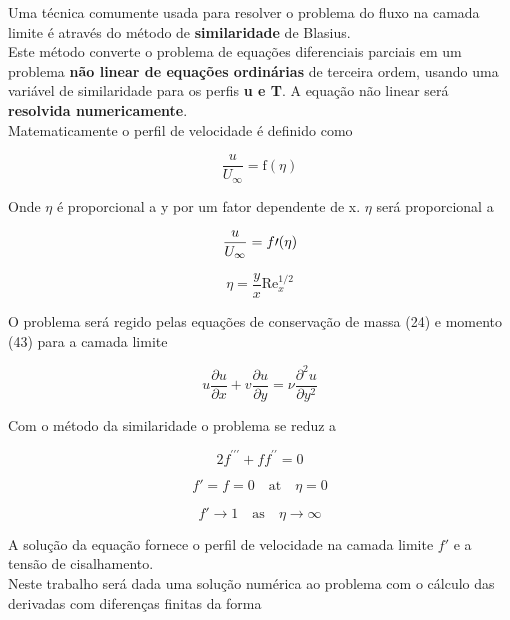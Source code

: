 \documentclass[12pt]{article}
\begin{document}
Uma técnica comumente usada para resolver o problema do fluxo na camada limite é através do método de \textbf{similaridade} de Blasius. \\
Este método converte o problema de equações diferenciais parciais em um problema \textbf{não linear de equações ordinárias} de terceira ordem, usando uma variável de similaridade para os perfis \textbf{u e T}. A equação não linear será \textbf{resolvida numericamente}.\\


Matematicamente o perfil de velocidade é definido como

\begin{equation}
	\frac{u}{U_\infty} = \text{f}(\eta)
\end{equation}

Onde $\eta$ é proporcional a y por um fator dependente de x. $\eta$ será proporcional a

\begin{equation}
	\frac{u}{U_\infty} = f\prime  (\eta) \\
\end{equation}

\begin{equation}
	\eta = \frac{y}{x} \text{Re}_x^{1/2}
\end{equation}

O problema será regido pelas equações de conservação de massa (24) e momento (43) para a camada limite

\begin{equation}
	u \frac{\partial u}{\partial x} + v \frac{\partial u}{\partial y} = \nu \frac{\partial^2 u}{\partial y^2}
\end{equation}

Com o método da similaridade o problema se reduz a

\begin{equation}
	2 f^{\prime\prime\prime} + f f^{\prime\prime} = 0
\end{equation}

\begin{equation}
	f' = f = 0 \quad \text{at} \quad \eta = 0
\end{equation}

\begin{equation}
	f' \to 1 \quad \text{as} \quad \eta \to \infty
\end{equation}

A solução da equação fornece o perfil de velocidade na camada limite $f\prime$ e a tensão de cisalhamento. \\
Neste trabalho será dada uma solução numérica ao problema com o cálculo das derivadas com diferenças finitas da forma
\end{document}
